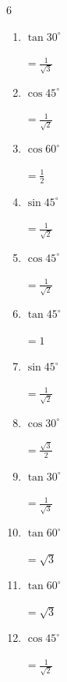 \begin{multicols}{6}
\begin{enumerate}
        $\displaystyle =\sqrt{3}$

  \item $\displaystyle \tan{30^\circ}$

        $\displaystyle =\frac{1}{\sqrt{3}}$

  \item $\displaystyle \cos{45^\circ}$

        $\displaystyle =\frac{1}{\sqrt{2}}$

  \item $\displaystyle \cos{60^\circ}$

        $\displaystyle =\frac{1}{2}$

  \item $\displaystyle \sin{45^\circ}$

        $\displaystyle =\frac{1}{\sqrt{2}}$

  \item $\displaystyle \cos{45^\circ}$

        $\displaystyle =\frac{1}{\sqrt{2}}$

  \item $\displaystyle \tan{45^\circ}$

        $\displaystyle =1$

\columnbreak %

\resetques

  \item $\displaystyle \sin{45^\circ}$

        $\displaystyle =\frac{1}{\sqrt{2}}$

  \item $\displaystyle \cos{30^\circ}$

        $\displaystyle =\frac{\sqrt{3}}{2}$

  \item $\displaystyle \tan{30^\circ}$

        $\displaystyle =\frac{1}{\sqrt{3}}$

  \item $\displaystyle \tan{60^\circ}$

        $\displaystyle =\sqrt{3}$

  \item $\displaystyle \tan{60^\circ}$

        $\displaystyle =\sqrt{3}$

  \item $\displaystyle \cos{45^\circ}$

        $\displaystyle =\frac{1}{\sqrt{2}}$


\end{enumerate}
\end{multicols}
